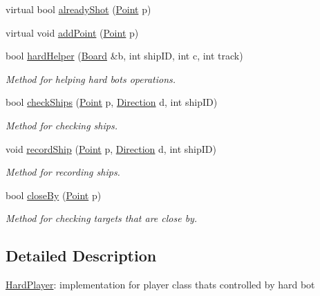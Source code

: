 \begin{DoxyCompactItemize}
\item 
virtual bool \mbox{\hyperlink{class_hard_player_a8107a94c8db7d5f1023dbeeddfaaedb2}{already\+Shot}} (\mbox{\hyperlink{class_point}{Point}} p)
\item 
virtual void \mbox{\hyperlink{class_hard_player_a77c82c1a36c9e956fdab98837ed888e5}{add\+Point}} (\mbox{\hyperlink{class_point}{Point}} p)
\item 
bool \mbox{\hyperlink{class_hard_player_aec6ff0ed3ef8f47ac46d374cff89e6be}{hard\+Helper}} (\mbox{\hyperlink{class_board}{Board}} \&b, int ship\+ID, int c, int track)
\begin{DoxyCompactList}\small\item\em Method for helping hard bot\textquotesingle{}s operations. \end{DoxyCompactList}\item 
bool \mbox{\hyperlink{class_hard_player_aebad1f5ad6f9ac20eb4f1ca639088c7b}{check\+Ships}} (\mbox{\hyperlink{class_point}{Point}} p, \mbox{\hyperlink{_globals_8h_a224b9163917ac32fc95a60d8c1eec3aa}{Direction}} d, int ship\+ID)
\begin{DoxyCompactList}\small\item\em Method for checking ships. \end{DoxyCompactList}\item 
void \mbox{\hyperlink{class_hard_player_a9358a28f7f0e618d3c98aba7b135e6a8}{record\+Ship}} (\mbox{\hyperlink{class_point}{Point}} p, \mbox{\hyperlink{_globals_8h_a224b9163917ac32fc95a60d8c1eec3aa}{Direction}} d, int ship\+ID)
\begin{DoxyCompactList}\small\item\em Method for recording ships. \end{DoxyCompactList}\item 
bool \mbox{\hyperlink{class_hard_player_a91cdd6239e111ea02bff561f6a3a0c41}{close\+By}} (\mbox{\hyperlink{class_point}{Point}} p)
\begin{DoxyCompactList}\small\item\em Method for checking target\textquotesingle{}s that are close by. \end{DoxyCompactList}\end{DoxyCompactItemize}


\subsection{Detailed Description}
\mbox{\hyperlink{class_hard_player}{Hard\+Player}}\+: implementation for player class that\textquotesingle{}s controlled by hard bot 

